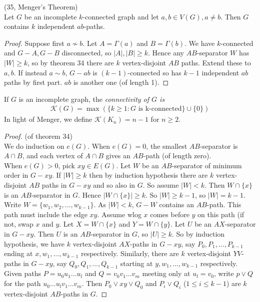 \documentclass[a4paper]{article}
\begin{document}
\begin{coro} (35, Menger's Theorem)\\
Let $G$ be an incomplete $k$-connected graph and let $a,b \in V(G), a \neq b$. Then $G$ contains $k$ independent $ab$-paths.
\begin{proof}
Suppose first $a \not\sim b$. Let $A = \Gamma(a)$ and $B = \Gamma(b)$. We have $k$-connected and $G-A,G-B$ disconnected, so $|A|,|B| \geq k$. Hence any $AB$-separator $W$ has $|W| \geq k$, so by theorem 34 there are $k$ vertex-disjoint $AB$ paths. Extend these to $a,b$. If instead $a \sim b$, $G-ab$ is $(k-1)$-connected so has $k-1$ independent $ab$ paths by first part. $ab$ is another one (of length 1).
\end{proof}
\end{coro}

\begin{defi}
If $G$ is an incomplete graph, the \emph{connectivity of $G$ is}
\begin{equation*}
\begin{aligned}
\mathcal{K}(G) = \max(\{k \geq 1: G \text{ is k-connected} \} \cup \{0\})
\end{aligned}
\end{equation*}
In light of Menger, we define $\mathcal{K}(K_n) = n-1$ for $n \geq 2$.
\end{defi}

\begin{proof} (of theorem 34)\\
We do induction on $e(G)$. When $e(G) =0$, the smallest $AB$-separator is $A \cap B$, and each vertex of $A \cap B$ gives an $AB$-path (of length zero).\\
When $e(G) > 0$, pick $xy \in E(G)$. Let $W$ be an $AB$-separator of minimum order in $G-xy$. If $|W| \geq k$ then by induction hypothesis there are $k$ vertex-disjoint $AB$ paths in $G-xy$ and so also in $G$. So assume $|W| < k$. Then $W \cap \{x\}$ is an $AB$-separator in $G$. Hence $|W \cap \{x\} | \geq k$. So $|W| \geq k-1$, so $|W| = k-1$. Write $W = \{w_1,w_2,...,w_{k-1}\}$. As $|W| < k$, $G-W$ contains an $AB$-path. This path must include the edge $xy$. Assume wlog $x$ comes before $y$ on this path (if not, swap $x$ and $y$. Let $X = W \cap \{x\}$ and $Y = W \cap \{y\}$. Let $U$ be an $AX$-separator in $G-xy$. Then $U$ is an $AB$-separator in $G$, so $|U| \geq k$. So by induction hypothesis, we have $k$ vertex-disjoint $AX$-paths in $G-xy$, say $P_0,P_1,...,P_{k-1}$ ending at $x,w_1,...,w_{k-1}$ respectively. Similarly, there are $k$ vertex-disjoint $YV$-paths in $G-xy$, say $Q_0,Q_1,...,Q_{k-1}$ starting at $y,w_1,...,w_{k-1}$ respectively. Given paths $P=u_0u_1...u_l$ and $Q = v_0v_1...v_m$ meeting only at $u_l = v_0$, write $p \vee Q$ for the path $u_0...u_l v_1...v_m$. Then $P_0 \vee xy \vee Q_0$ and $P_i \vee Q_i$ ($1 \leq i \leq k-1$) are $k$ vertex-disjoint $AB$-paths in $G$.
\end{proof}
\end{document}
